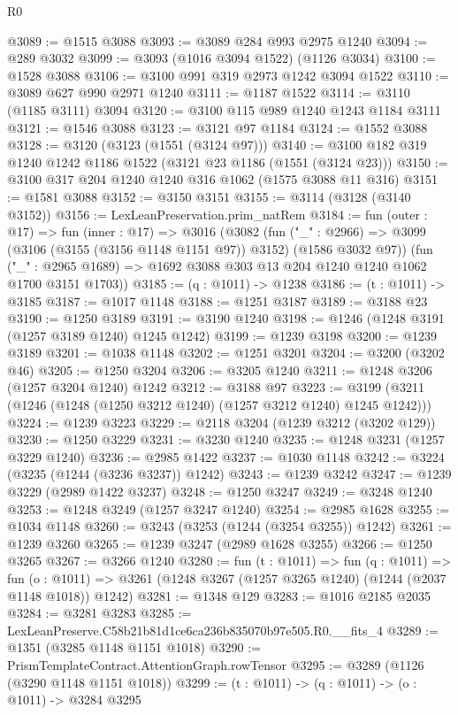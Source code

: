 \begin{lexlean}{R0}
\begin{coremodule}
@3089 := @1515 @3088
@3093 := @3089 @284 @993 @2975 @1240
@3094 := @289 @3032
@3099 := @3093 (@1016 @3094 @1522) (@1126 @3034)
@3100 := @1528 @3088
@3106 := @3100 @991 @319 @2973 @1242 @3094 @1522
@3110 := @3089 @627 @990 @2971 @1240
@3111 := @1187 @1522
@3114 := @3110 (@1185 @3111) @3094
@3120 := @3100 @115 @989 @1240 @1243 @1184 @3111
@3121 := @1546 @3088
@3123 := @3121 @97 @1184
@3124 := @1552 @3088
@3128 := @3120 (@3123 (@1551 (@3124 @97)))
@3140 := @3100 @182 @319 @1240 @1242 @1186 @1522 (@3121 @23 @1186 (@1551 (@3124 @23)))
@3150 := @3100 @317 @204 @1240 @1240 @316 @1062 (@1575 @3088 @11 @316)
@3151 := @1581 @3088
@3152 := @3150 @3151
@3155 := @3114 (@3128 (@3140 @3152))
@3156 := LexLeanPreservation.prim_natRem
@3184 := fun (outer : @17) =>
  fun (inner : @17) =>
  @3016
    (@3082
      (fun ("_" : @2966) => @3099 (@3106 (@3155 (@3156 @1148 @1151 @97)) @3152) (@1586 @3032 @97))
      (fun ("_" : @2965 @1689) => @1692 @3088 @303 @13 @204 @1240 @1240 @1062 @1700 @3151 @1703))
@3185 := (q : @1011) -> @1238
@3186 := (t : @1011) -> @3185
@3187 := @1017 @1148
@3188 := @1251 @3187
@3189 := @3188 @23
@3190 := @1250 @3189
@3191 := @3190 @1240
@3198 := @1246 (@1248 @3191 (@1257 @3189 @1240) @1245 @1242)
@3199 := @1239 @3198
@3200 := @1239 @3189
@3201 := @1038 @1148
@3202 := @1251 @3201
@3204 := @3200 (@3202 @46)
@3205 := @1250 @3204
@3206 := @3205 @1240
@3211 := @1248 @3206 (@1257 @3204 @1240) @1242
@3212 := @3188 @97
@3223 := @3199 (@3211 (@1246 (@1248 (@1250 @3212 @1240) (@1257 @3212 @1240) @1245 @1242)))
@3224 := @1239 @3223
@3229 := @2118 @3204 (@1239 @3212 (@3202 @129))
@3230 := @1250 @3229
@3231 := @3230 @1240
@3235 := @1248 @3231 (@1257 @3229 @1240)
@3236 := @2985 @1422
@3237 := @1030 @1148
@3242 := @3224 (@3235 (@1244 (@3236 @3237)) @1242)
@3243 := @1239 @3242
@3247 := @1239 @3229 (@2989 @1422 @3237)
@3248 := @1250 @3247
@3249 := @3248 @1240
@3253 := @1248 @3249 (@1257 @3247 @1240)
@3254 := @2985 @1628
@3255 := @1034 @1148
@3260 := @3243 (@3253 (@1244 (@3254 @3255)) @1242)
@3261 := @1239 @3260
@3265 := @1239 @3247 (@2989 @1628 @3255)
@3266 := @1250 @3265
@3267 := @3266 @1240
@3280 := fun (t : @1011) =>
  fun (q : @1011) =>
  fun (o : @1011) => @3261 (@1248 @3267 (@1257 @3265 @1240) (@1244 (@2037 @1148 @1018)) @1242)
@3281 := @1348 @129
@3283 := @1016 @2185 @2035
@3284 := @3281 @3283
@3285 := LexLeanPreserve.C58b21b81d1ce6ca236b835070b97e505.R0.__fits_4
@3289 := @1351 (@3285 @1148 @1151 @1018)
@3290 := PrismTemplateContract.AttentionGraph.rowTensor
@3295 := @3289 (@1126 (@3290 @1148 @1151 @1018))
@3299 := (t : @1011) -> (q : @1011) -> (o : @1011) -> @3284 @3295

\end{coremodule}
\end{lexlean}
